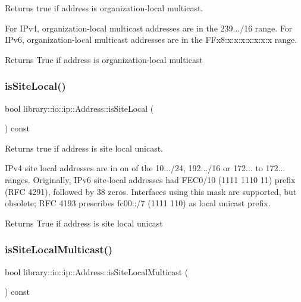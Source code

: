 Returns true if address is organization-\/local multicast. 

For I\+Pv4, organization-\/local multicast addresses are in the 239.../16 range. For I\+Pv6, organization-\/local multicast addresses are in the F\+Fx8\+:x\+:x\+:x\+:x\+:x\+:x\+:x range.

\begin{DoxyReturn}{Returns}
True if address is organization-\/local multicast 
\end{DoxyReturn}
\mbox{\label{classlibrary_1_1io_1_1ip_1_1_address_aeb2f2c318f7144c1d74c2035be3d4eab}} 
\subsubsection{\texorpdfstring{is\+Site\+Local()}{isSiteLocal()}}
{\footnotesize\ttfamily bool library\+::io\+::ip\+::\+Address\+::is\+Site\+Local (\begin{DoxyParamCaption}{ }\end{DoxyParamCaption}) const}



Returns true if address is site local unicast. 

I\+Pv4 site local addresses are in on of the 10.../24, 192.../16 or 172... to 172... ranges. Originally, I\+Pv6 site-\/local addresses had F\+E\+C0/10 (1111 1110 11) prefix (R\+FC 4291), followed by 38 zeros. Interfaces using this mask are supported, but obsolete; R\+FC 4193 prescribes fc00\+:\+:/7 (1111 110) as local unicast prefix.

\begin{DoxyReturn}{Returns}
True if address is site local unicast 
\end{DoxyReturn}
\mbox{\label{classlibrary_1_1io_1_1ip_1_1_address_a14420f343bc580c0689611670cfd1eaa}} 
\subsubsection{\texorpdfstring{is\+Site\+Local\+Multicast()}{isSiteLocalMulticast()}}
{\footnotesize\ttfamily bool library\+::io\+::ip\+::\+Address\+::is\+Site\+Local\+Multicast (\begin{DoxyParamCaption}{ }\end{DoxyParamCaption}) const}




